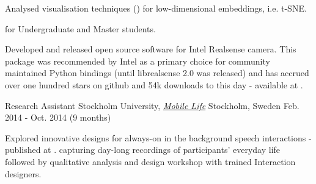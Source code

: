 \begin{cventries}
{\begin{cvitems}
{\begin{itemize}
        \end{itemize}
        }
        \item {Analysed visualisation techniques () for low-dimensional embeddings, i.e. t-SNE.}
        \item { for Undergraduate and Master students.}
        \item {Developed and released open source software for Intel Realsense camera. This package was recommended by Intel as a primary choice for community maintained Python bindings (until librealsense 2.0 was released) and has accrued over one hundred stars on github and 54k downloads to this day - available at .}
      \end{cvitems}
    }

  \cventry
    {Research Assistant} %
    {Stockholm University, \textit{\href{http://www.mobilelifecentre.org/}{Mobile Life}}} %
    {Stockholm, Sweden} %
    {Feb. 2014 - Oct. 2014 (9 months)} %
    {
      \begin{cvitems} %
        \item {Explored innovative designs for always-on in the background speech interactions - published at .  capturing day-long recordings of participants’ everyday life followed by qualitative analysis and design workshop with trained Interaction designers.}
      \end{cvitems}
    }
\end{cventries}



